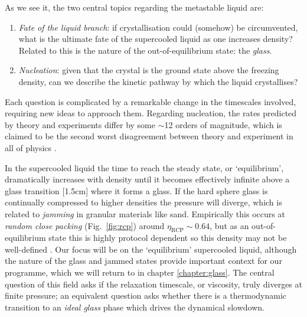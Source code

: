 \documentclass[11pt,twoside]{report}
\begin{document}
As we see it, the two central topics regarding the metastable liquid are:
\begin{enumerate}
\item \emph{Fate of the liquid branch}: if crystallisation could (somehow) be circumvented, what is the ultimate fate of the supercooled liquid as one increases density?
  Related to this is the nature of the out-of-equilibrium state: the \emph{glass}.
\item \emph{Nucleation}: given that the crystal is the ground state above the freezing density, can we describe the kinetic pathway by which the liquid crystallises?
\end{enumerate}
Each question is complicated by a remarkable change in the timescales involved, requiring new ideas to approach them.
Regarding nucleation, the rates predicted by theory and experiments differ by some $\sim$12 orders of magnitude, which is claimed to be the second worst disagreement%
between theory and experiment in all of physics \cite{RussoSM2013}.

In the supercooled liquid the time to reach the steady state, or `equilibrium', dramatically increases with density until it becomes effectively infinite above a glass transition%
[1.5cm]
where it forms a glass.
If the hard sphere glass is continually compressed to higher densities the pressure will diverge, which is related to \emph{jamming} in granular materials like sand.
Empirically this occurs at \emph{random close packing} (Fig.\ \ref{fig:rcp}) around $\eta_\mathrm{RCP} \sim 0.64$, but as an out-of-equilibrium state this is highly protocol dependent so this density may not be well-defined \cite{TorquatoRMP2010}.
Our focus will be on the `equilibrium' supercooled liquid, although the nature of the glass and jammed states provide important context for our programme, which we will return to in chapter \ref{chapter:glass}.
The central question of this field asks if the relaxation timescale, or viscosity, truly diverges at finite pressure; an equivalent question asks whether there is a thermodynamic transition to an \emph{ideal glass} phase which drives the dynamical slowdown.
\end{document}

